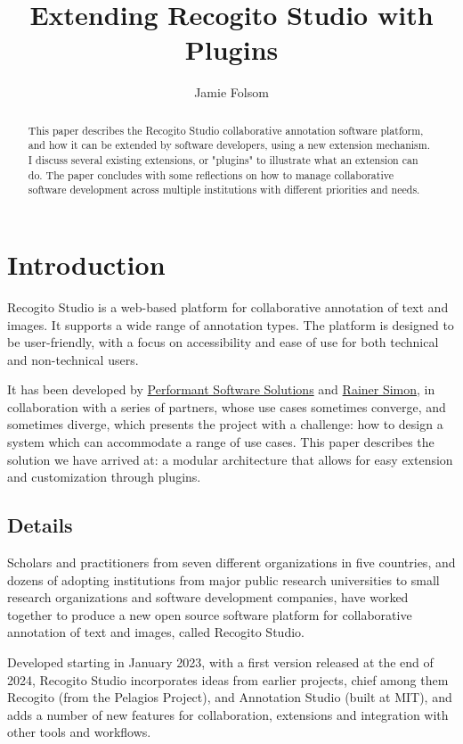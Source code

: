 \documentclass[final]{anthology-ch}         %
\title{Extending Recogito Studio with Plugins}
\author[1]{Jamie Folsom}[
  orcid=0000-0001-8963-7072
]
\affiliation{1}{Performant Software Solutions, Boston MA, United States}
\begin{document}
\maketitle

\begin{abstract}
This paper describes the Recogito Studio collaborative annotation software platform, and how it can be extended by software developers, using a new extension mechanism. I discuss several existing extensions, or "plugins" to illustrate what an extension can do.  The paper concludes with some reflections on how to manage collaborative software development across multiple institutions with different priorities and needs.
\end{abstract}

\section{Introduction} 

Recogito Studio is a web-based platform for collaborative annotation of text and images. It supports a wide range of annotation types. The platform is designed to be user-friendly, with a focus on accessibility and ease of use for both technical and non-technical users.

It has been developed by \href{https://www.performantsoftware.com/}{Performant Software Solutions} and \href{https://rainersimon.io/}{Rainer Simon}, in collaboration with a series of partners, whose use cases sometimes converge, and sometimes diverge, which presents the project with a challenge: how to design a system which can accommodate a range of use cases. This paper describes the solution we have arrived at: a modular architecture that allows for easy extension and customization through plugins.

\subsection{Details} \label{sec:intro_details}

Scholars and practitioners from seven different organizations in five countries, and dozens of adopting institutions from major public research universities to small research organizations and software development companies, have worked together to produce a new open source software platform for collaborative annotation of text and images, called Recogito Studio.

Developed starting in January 2023, with a first version released at the end of 2024, Recogito Studio incorporates ideas from earlier projects, chief among them Recogito (from the Pelagios Project), and Annotation Studio (built at MIT), and adds a number of new features for collaboration, extensions and integration with other tools and workflows.
\end{document}
